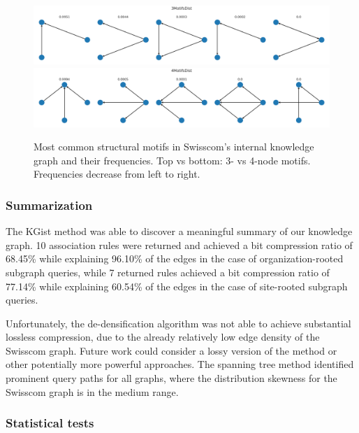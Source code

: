 \begin{figure}[ht!]
    \centering
    \includegraphics[width=\textwidth]{figures/swisscom/3motifs.png}
    \includegraphics[width=\textwidth]{figures/swisscom/4motifs.png}
    \caption[Most common structural motifs in Swisscom's internal knowledge graph and their frequencies.]{Most common structural motifs in Swisscom's internal knowledge graph and their frequencies. Top vs bottom: 3- vs 4-node motifs. Frequencies decrease from left to right.}
    \label{fig:motifs}
\end{figure}

\subsubsection{Summarization}

The KGist method was able to discover a meaningful summary of our knowledge graph. 10 association rules were returned and achieved a bit compression ratio of 68.45\% while explaining 96.10\% of the edges in the case of organization-rooted subgraph queries, while 7 returned rules achieved a bit compression ratio of 77.14\% while explaining 60.54\% of the edges in the case of site-rooted subgraph queries. %

Unfortunately, the de-densification algorithm was not able to achieve substantial lossless compression, due to the already relatively low edge density of the Swisscom graph. Future work could consider a lossy version of the method or other potentially more powerful approaches. The spanning tree method identified prominent query paths for all graphs, where the distribution skewness for the Swisscom graph is in the medium range.

\subsubsection{Statistical tests}

